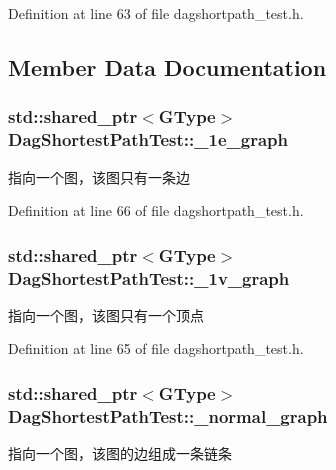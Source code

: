 Definition at line 63 of file dagshortpath\+\_\+test.\+h.



\subsection{Member Data Documentation}
\hypertarget{class_dag_shortest_path_test_a63cb4f638b9be6c6f0647775fd2b3419}{}
\subsubsection[{\+\_\+1e\+\_\+graph}]{\setlength{\rightskip}{0pt plus 5cm}std\+::shared\+\_\+ptr$<${\bf G\+Type}$>$ Dag\+Shortest\+Path\+Test\+::\+\_\+1e\+\_\+graph\hspace{0.3cm}{\ttfamily [protected]}}\label{class_dag_shortest_path_test_a63cb4f638b9be6c6f0647775fd2b3419}
指向一个图，该图只有一条边 

Definition at line 66 of file dagshortpath\+\_\+test.\+h.

\hypertarget{class_dag_shortest_path_test_a6d07675b5b9714443bdcb1d7da426624}{}
\subsubsection[{\+\_\+1v\+\_\+graph}]{\setlength{\rightskip}{0pt plus 5cm}std\+::shared\+\_\+ptr$<${\bf G\+Type}$>$ Dag\+Shortest\+Path\+Test\+::\+\_\+1v\+\_\+graph\hspace{0.3cm}{\ttfamily [protected]}}\label{class_dag_shortest_path_test_a6d07675b5b9714443bdcb1d7da426624}
指向一个图，该图只有一个顶点 

Definition at line 65 of file dagshortpath\+\_\+test.\+h.

\hypertarget{class_dag_shortest_path_test_ac96676722661c8d7ad6baf5bd4dbf3a7}{}
\subsubsection[{\+\_\+normal\+\_\+graph}]{\setlength{\rightskip}{0pt plus 5cm}std\+::shared\+\_\+ptr$<${\bf G\+Type}$>$ Dag\+Shortest\+Path\+Test\+::\+\_\+normal\+\_\+graph\hspace{0.3cm}{\ttfamily [protected]}}\label{class_dag_shortest_path_test_ac96676722661c8d7ad6baf5bd4dbf3a7}
指向一个图，该图的边组成一条链条 

